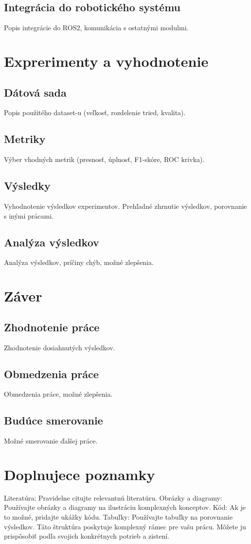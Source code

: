 \subsection{Integrácia do robotického systému}Popis integrácie do ROS2, komunikácia s ostatnými modulmi.

\section{Exprerimenty a vyhodnotenie}
\subsection{Dátová sada} Popis použitého dataset-u (veľkosť, rozdelenie tried, kvalita).
\subsection{Metriky} Výber vhodných metrik (presnosť, úplnosť, F1-skóre, ROC krivka).
\subsection{Výsledky} Vyhodnotenie výsledkov experimentov. Prehľadné zhrnutie výsledkov, porovnanie s inými prácami.
\subsection{Analýza výsledkov} Analýza výsledkov, príčiny chýb, možné zlepšenia.

\section{Záver}
\subsection{Zhodnotenie práce}Zhodnotenie dosiahnutých výsledkov.
\subsection{Obmedzenia práce}Obmedzenia práce, možné zlepšenia.
\subsection{Budúce smerovanie}Možné smerovanie ďalšej práce.

\section{Doplnujece poznamky }
Literatúra: Pravidelne citujte relevantnú literatúru.
Obrázky a diagramy: Používajte obrázky a diagramy na ilustráciu komplexných konceptov.
Kód: Ak je to možné, pridajte ukážky kódu.
Tabuľky: Používajte tabuľky na porovnanie výsledkov.
Táto štruktúra poskytuje komplexný rámec pre vašu prácu. Môžete ju prispôsobiť podľa svojich konkrétnych potrieb a zistení.